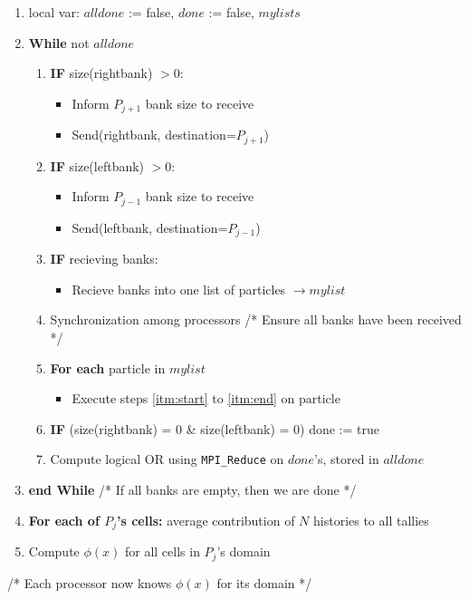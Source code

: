 \documentclass[12pt]{article}
\begin{document}
{{\begin{algorithm}
\begin{enumerate}
    \item local var: $alldone$ := false, $done$ := false, $mylists$
    \item \textbf{While} not $alldone$
    \begin{enumerate}
       \item \textbf{IF} size(rightbank) $> 0$:
         \begin{itemize}
            \item Inform $P_{j+1}$ bank size to receive
            \item Send(rightbank, destination=$P_{j+1}$)
         \end{itemize}
       \item \textbf{IF} size(leftbank) $> 0$:
         \begin{itemize}
             \item Inform $P_{j-1}$ bank size to receive
            \item Send(leftbank, destination=$P_{j-1}$)
         \end{itemize}
       \item \textbf{IF} recieving banks: 
         \begin{itemize}
              \item Recieve banks into one list of particles $\rightarrow mylist$
          \end{itemize}
      \item Synchronization among processors /* Ensure all banks have been received */
      \item \textbf{For each} particle in $mylist$
          \begin{itemize}
              \item Execute steps \ref{itm:start} to \ref{itm:end} on particle
          \end{itemize}
     \item \textbf{IF} (size(rightbank) = 0 \& size(leftbank) = 0) done := true
     \item Compute logical OR using \verb{MPI_Reduce{ on $done$'s, stored in $alldone$
    \end{enumerate}
    \item[] \textbf{end While} /* If all banks are empty, then we are done */
    \item \textbf{For each of $P_j$'s cells:} average contribution of $N$ histories to all tallies
    \item Compute $\phi(x)$ for all cells in $P_j$'s domain
\end{enumerate}
/* Each processor now knows $\phi(x)$ for its domain */
\end{algorithm}

}}
\end{document}
